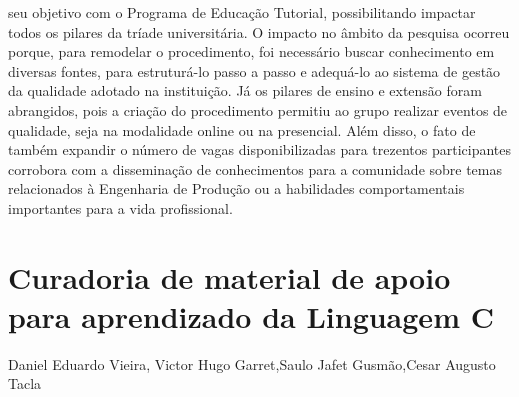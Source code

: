 seu objetivo com o Programa de Educação Tutorial, possibilitando impactar todos os pilares da 
tríade universitária. O impacto no âmbito da pesquisa ocorreu porque, para remodelar o 
procedimento, foi necessário buscar conhecimento em diversas fontes, para estruturá-lo passo a 
passo e adequá-lo ao sistema de gestão da qualidade adotado na instituição. Já os pilares de ensino 
e extensão foram abrangidos, pois a criação do procedimento permitiu ao grupo realizar eventos 
de qualidade, seja na modalidade online ou na presencial. Além disso, o fato de também expandir 
o número de vagas disponibilizadas para trezentos participantes corrobora com a disseminação de 
conhecimentos para a comunidade sobre temas relacionados à Engenharia de Produção ou a 
habilidades comportamentais importantes para a vida profissional.



\section{Curadoria de material de apoio para aprendizado da Linguagem C}

Daniel Eduardo Vieira, Victor Hugo Garret,Saulo Jafet Gusmão,Cesar Augusto Tacla

